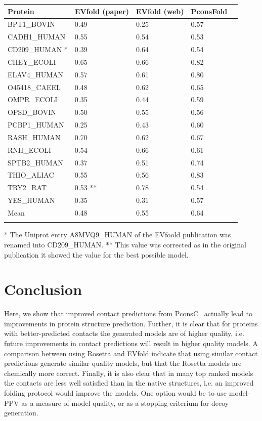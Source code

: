 \documentclass{bioinfo}
\begin{document}
\begin{table}[!t]
{\begin{tabular}{lp{1.5cm}p{1.5cm}p{1.5cm}p{1.5cm}}\toprule
Protein & EVfold (paper) & EVfold (web)   & PconsFold\\\midrule
BPT1\_BOVIN & 0.49 & 0.25    & 0.57 \\
CADH1\_HUMAN & 0.55 & 0.54    & 0.53 \\
CD209\_HUMAN * & 0.39 & 0.64    & 0.54 \\
CHEY\_ECOLI & 0.65 & 0.66   & 0.82 \\
ELAV4\_HUMAN & 0.57 & 0.61    & 0.80 \\
O45418\_CAEEL & 0.48 & 0.62   & 0.65 \\
OMPR\_ECOLI & 0.35 & 0.44    & 0.59 \\
OPSD\_BOVIN & 0.50 & 0.55    & 0.56 \\
PCBP1\_HUMAN & 0.25 & 0.43    & 0.60 \\
RASH\_HUMAN & 0.70 & 0.62   & 0.67 \\
RNH\_ECOLI & 0.54 & 0.66   & 0.61 \\
SPTB2\_HUMAN & 0.37 & 0.51  & 0.74 \\
THIO\_ALIAC & 0.55 & 0.56   & 0.83 \\
TRY2\_RAT & 0.53 ** & 0.78    & 0.54 \\
YES\_HUMAN & 0.35 & 0.31   & 0.57 \\ \midrule
Mean & 0.48 & 0.55   & 0.64 \\ \botrule
\end{tabular}}{* The Uniprot entry A8MVQ9\_HUMAN of the EVfoold publication was renamed into CD209\_HUMAN. ** This value was corrected as in the original publication it showed the value for the best possible model.}
\end{table}

\section{Conclusion}


Here, we show that improved contact predictions from
PconsC~\cite{skwark_PconsC:_2013} actually lead to improvements in
protein structure prediction. Further, it is clear that for proteins
with better-predicted contacts the generated models are of higher
quality, i.e. future improvements in contact predictions will result
in higher quality models. A comparison between using Rosetta and
EVfold indicate that using similar contact predictions generate
similar quality models, but that the Rosetta models are chemically
more correct. Finally, it is also clear that in many top ranked models
the contacts are less well satisfied than in the native structures,
i.e. an improved folding protocol would improve the models.  One
option would be to use model-PPV as a measure of model quality, or as
a stopping criterium for decoy generation.
\end{document}
